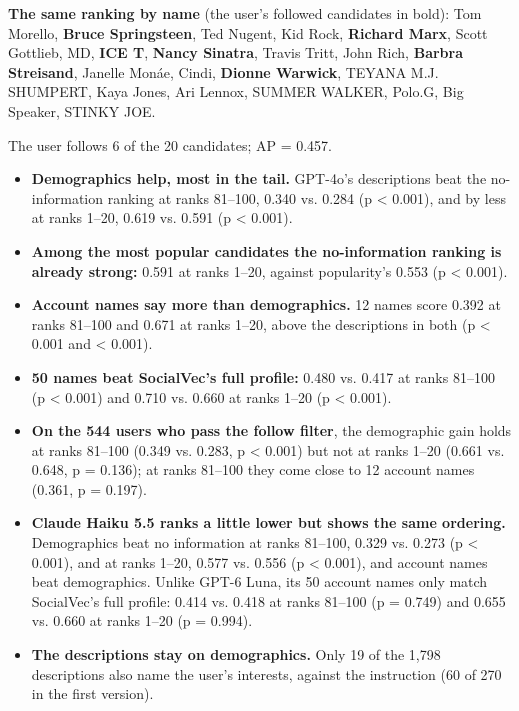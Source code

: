 \documentclass[10pt]{article}
\begin{document}
\textbf{The same ranking by name} (the user's followed candidates in bold): Tom Morello, \textbf{Bruce Springsteen}, Ted Nugent, Kid Rock, \textbf{Richard Marx}, Scott Gottlieb, MD, \textbf{ICE T}, \textbf{Nancy Sinatra}, Travis Tritt, John Rich, \textbf{Barbra Streisand}, Janelle Monáe, Cindi, \textbf{Dionne Warwick}, TEYANA M.J. SHUMPERT, Kaya Jones, Ari Lennox, SUMMER WALKER, Polo.G, Big Speaker, STINKY JOE.

The user follows 6 of the 20 candidates; AP = 0.457.

\begin{itemize}
  \item \textbf{Demographics help, most in the tail.} GPT-4o's descriptions beat the no-information ranking at ranks 81--100, 0.340 vs. 0.284 (p \textless{} 0.001), and by less at ranks 1--20, 0.619 vs. 0.591 (p \textless{} 0.001).
  \item \textbf{Among the most popular candidates the no-information ranking is already strong:} 0.591 at ranks 1--20, against popularity's 0.553 (p \textless{} 0.001).
  \item \textbf{Account names say more than demographics.} 12 names score 0.392 at ranks 81--100 and 0.671 at ranks 1--20, above the descriptions in both (p \textless{} 0.001 and \textless{} 0.001).
  \item \textbf{50 names beat SocialVec's full profile:} 0.480 vs. 0.417 at ranks 81--100 (p \textless{} 0.001) and 0.710 vs. 0.660 at ranks 1--20 (p \textless{} 0.001).
  \item \textbf{On the 544 users who pass the follow filter}, the demographic gain holds at ranks 81--100 (0.349 vs. 0.283, p \textless{} 0.001) but not at ranks 1--20 (0.661 vs. 0.648, p = 0.136); at ranks 81--100 they come close to 12 account names (0.361, p = 0.197).
  \item \textbf{Claude Haiku 5.5 ranks a little lower but shows the same ordering.} Demographics beat no information at ranks 81--100, 0.329 vs. 0.273 (p \textless{} 0.001), and at ranks 1--20, 0.577 vs. 0.556 (p \textless{} 0.001), and account names beat demographics. Unlike GPT-6 Luna, its 50 account names only match SocialVec's full profile: 0.414 vs. 0.418 at ranks 81--100 (p = 0.749) and 0.655 vs. 0.660 at ranks 1--20 (p = 0.994).
  \item \textbf{The descriptions stay on demographics.} Only 19 of the 1,798 descriptions also name the user's interests, against the instruction (60 of 270 in the first version).
\end{itemize}
\end{document}
